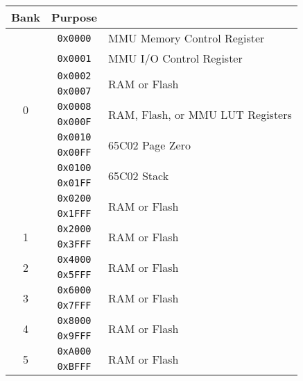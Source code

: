 \begin{table}[ht]
    \begin{center}
        \begin{tabular}{|c|c|l|} \hline
            Bank & Purpose \\ \hline\hline
            \multirow{10}{*}{0} & \verb+0x0000+ & MMU Memory Control Register \\ \cline{2-3}
            & \verb+0x0001+ & MMU I/O Control Register \\ \cline{2-3}
            & \verb+0x0002+ & \multirow{2}{*}{RAM or Flash} \\ \cline{2-2}
            & \verb+0x0007+ & \\ \cline{2-3}
            & \verb+0x0008+ & \multirow{2}{*}{RAM, Flash, or MMU LUT Registers} \\ \cline{2-2}
            & \verb+0x000F+ & \\ \cline{2-3}
            & \verb+0x0010+ & \multirow{2}{*}{65C02 Page Zero} \\ \cline{2-2}
            & \verb+0x00FF+ & \\ \cline{2-3}
            & \verb+0x0100+ & \multirow{2}{*}{65C02 Stack} \\ \cline{2-2}
            & \verb+0x01FF+ & \\ \cline{2-3}
            & \verb+0x0200+ & \multirow{2}{*}{RAM or Flash} \\ \cline{2-2}
            & \verb+0x1FFF+ & \\ \hline
            \multirow{2}{*}{1} & \verb+0x2000+ & \multirow{2}{*}{RAM or Flash} \\ \cline{2-2}
            & \verb+0x3FFF+ & \\ \hline
            \multirow{2}{*}{2} & \verb+0x4000+ & \multirow{2}{*}{RAM or Flash} \\ \cline{2-2}
            & \verb+0x5FFF+ & \\ \hline
            \multirow{2}{*}{3} & \verb+0x6000+ & \multirow{2}{*}{RAM or Flash} \\ \cline{2-2}
            & \verb+0x7FFF+ & \\ \hline
            \multirow{2}{*}{4} & \verb+0x8000+ & \multirow{2}{*}{RAM or Flash} \\ \cline{2-2}
            & \verb+0x9FFF+ & \\ \hline
            \multirow{2}{*}{5} & \verb+0xA000+ & \multirow{2}{*}{RAM or Flash} \\ \cline{2-2}
            & \verb+0xBFFF+ & \\ \hline

\end{tabular}
\end{center}
\end{table}
